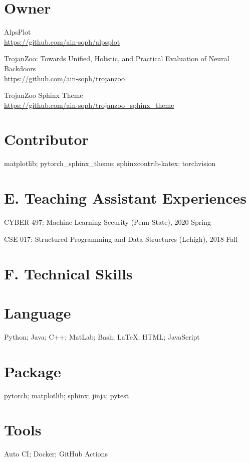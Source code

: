 \documentclass{resume}
\begin{document}
\begin{resume}
\section{Owner}
\vspace{8pt}

AlpsPlot \\
\url{https://github.com/ain-soph/alpsplot}

TrojanZoo: Towards Unified, Holistic, and Practical Evaluation of Neural Backdoors \\
\url{https://github.com/ain-soph/trojanzoo}

TrojanZoo Sphinx Theme \\
\url{https://github.com/ain-soph/trojanzoo_sphinx_theme}

\section{Contributor}
\vspace{8pt}

matplotlib; pytorch\_sphinx\_theme; sphinxcontrib-katex; torchvision


\vspace{0.2in} 
\section{E. Teaching Assistant Experiences} 
\vspace{8pt}

CYBER 497: Machine Learning Security (Penn State), 2020 Spring

CSE 017: Structured Programming and Data Structures (Lehigh), 2018 Fall


\vspace{0.2in} 
\section{F. Technical Skills} 
\vspace{8pt}

\section{Language}
\vspace{8pt}

Python; Java; C++; MatLab; Bash; LaTeX; HTML; JavaScript

\section{Package}
\vspace{8pt}

pytorch; matplotlib; sphinx; jinja; pytest

\section{Tools}
\vspace{8pt}

Auto CI; Docker; GitHub Actions

\end{resume} 
\end{document}
